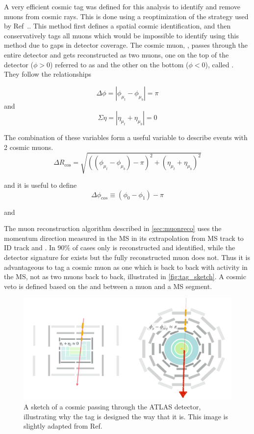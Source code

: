 A very efficient cosmic tag was defined for this analysis to identify and remove muons from cosmic rays. This is done using a reoptimization of the strategy used by Ref~.\cite{dvplusmu}. This method first defines a spatial cosmic identification, and then conservatively tags all muons which would be impossible to identify using this method due to gaps in detector coverage. The cosmic muon, \mcos, passes through the entire detector and gets reconstructed as two muons, one on the top of the detector ($\phi > 0$) referred to as \mt and the other on the bottom ($\phi < 0$), called \mb. They follow the relationships 

\begin{equation}
\Delta \phi = |\phi_{\mu_{t}} - \phi_{\mu_{b}}| = \pi 
\end{equation}
and 
\begin{equation}
\Sigma \eta = |\eta_{\mu_{t}} + \eta_{\mu_{b}}| = 0
\end{equation} 

The combination of these variables form a useful variable to describe events with 2 cosmic muons.
\begin{equation}
\Delta R_{\text{cos}} = \sqrt{ ((\phi_{\mu_{t}} - \phi_{\mu_{b}}) - \pi) ^{2} + (\eta_{\mu_{t}} + \eta_{\mu_{b}})^2}
\end{equation}

and it is useful to define
\begin{equation}
\Delta \phi_{cos} \equiv (\phi_{0} - \phi_{1}) - \pi 
\end{equation}

and 


The muon reconstruction algorithm described in \autoref{sec:muonreco} uses the momentum direction measured in the \ac{MS} in its extrapolation from \ac{MS} track to \ac{ID} track and . In 90\% of cases only \mb is reconstructed and identified, while the detector signature for \mt exists but the fully reconstructed muon does not. Thus it is advantageous to tag a cosmic muon as one which is back to back with activity in the \ac{MS}, not as two muons back to back, illustrated in \autoref{fig:tag_sketch}. A cosmic veto is defined based on the \dphicos and \sigeta between a muon and a \ac{MS} segment. 

\begin{figure}[!ht]
\centering
\includegraphics[width=.8\textwidth]{figures/cosmics/tag_sketch.png}
\caption{A sketch of a cosmic passing through the ATLAS detector, illustrating why the tag is designed the way that it is. This image is slightly adapted from Ref.~\cite{dvplusmu}}
\label{fig:tag_sketch}
\end{figure}


